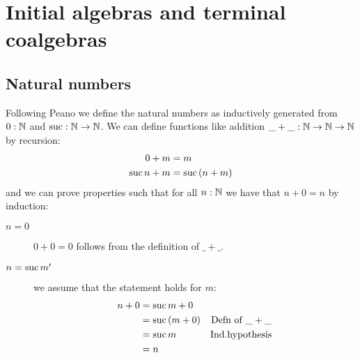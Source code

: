 \chapter{Initial algebras and terminal coalgebras}
\label{chap:init-algebr-term}

\section{Natural numbers}
\label{sec:natural-numbers}

Following Peano we define the natural numbers as inductively generated from $0:\mathbb{N}$ and $\mathrm{suc} : \mathbb{N} \to \mathbb{N}$. We can define functions like addition
$\_+\_ : \mathbb{N} \to \mathbb{N} \to \mathbb{N}$ by recursion:
\begin{align*}
  0 + m & = m\\
  \mathrm{suc}\,n + m & = \mathrm{suc}\,(n + m)
\end{align*}
and we can prove properties such that for all $n : \mathbb{N}$ we have that $n + 0 = n$ by induction:
\begin{description}
\item[$n=0$] $0 + 0 = 0$ follows from the definition of $\_+\_$.
\item[$n = \mathrm{suc}\,m'$] we assume that the statement holds for $m$:
  \begin{align*}
    n + 0 
    & = \mathrm{suc}\,m + 0 \\
    & = \mathrm{suc}\,(m + 0) & \mbox{Defn of $\_+\_$}\\
    & = \mathrm{suc}\,m & \mbox{Ind.hypothesis} \\
    & = n
  \end{align*}
\end{description}

